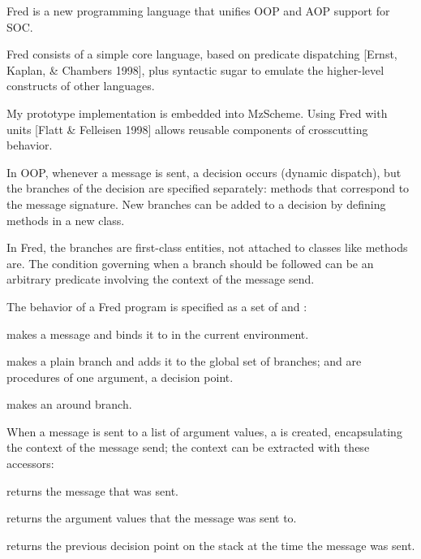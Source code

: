 \documentclass[landscape]{slides}
\begin{document}
\begin{slide}
Fred is a new programming language that unifies OOP and AOP support
for SOC.

Fred consists of a simple core language, based on predicate
dispatching [Ernst, Kaplan, \& Chambers 1998], plus syntactic sugar to
emulate the higher-level constructs of other languages.

My prototype implementation is embedded into MzScheme.  Using Fred
with units [Flatt \& Felleisen 1998] allows reusable components of
crosscutting behavior.
\end{slide}

\begin{slide}
In OOP, whenever a message is sent, a decision occurs (dynamic
dispatch), but the branches of the decision are specified
separately: methods that correspond to the message signature.
New branches can be added to a decision by defining methods in a new
class.

In Fred, the branches are first-class entities, not attached to
classes like methods are.  The condition governing when a branch
should be followed can be an arbitrary predicate involving the context
of the message send.
\end{slide}

\begin{slide}
The behavior of a Fred program is specified as a set of
 and :
\begin{bullets}
\item {} makes a message and binds it to
 in the current environment.

\item {} makes a plain
branch and adds it to the global set of branches;  and
 are procedures of one argument, a decision point.

\item {} makes
an around branch.
\end{bullets}
\end{slide}

\begin{slide}
When a message is sent to a list of argument values, a
 is created, encapsulating the context of the
message send; the context can be extracted with these accessors:
\begin{bullets}
\item {} returns the message that was sent.

\item {} returns the argument values that the
      message was sent to.

\item {} returns the previous decision
      point on the stack at the time the message was sent.
\end{bullets}
\end{slide}
\end{document}
